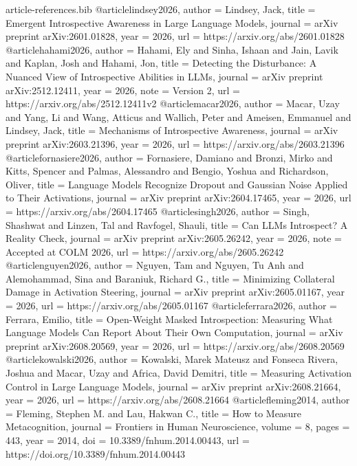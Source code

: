 \begin{filecontents*}{article-references.bib}
@article{lindsey2026,
  author = {Lindsey, Jack},
  title = {Emergent Introspective Awareness in Large Language Models},
  journal = {arXiv preprint arXiv:2601.01828},
  year = {2026}, url = {https://arxiv.org/abs/2601.01828}
}
@article{hahami2026,
  author = {Hahami, Ely and Sinha, Ishaan and Jain, Lavik and Kaplan, Josh and Hahami, Jon},
  title = {Detecting the Disturbance: A Nuanced View of Introspective Abilities in {LLMs}},
  journal = {arXiv preprint arXiv:2512.12411},
  year = {2026}, note = {Version 2},
  url = {https://arxiv.org/abs/2512.12411v2}
}
@article{macar2026,
  author = {Macar, Uzay and Yang, Li and Wang, Atticus and Wallich, Peter and Ameisen, Emmanuel and Lindsey, Jack},
  title = {Mechanisms of Introspective Awareness},
  journal = {arXiv preprint arXiv:2603.21396},
  year = {2026}, url = {https://arxiv.org/abs/2603.21396}
}
@article{fornasiere2026,
  author = {Fornasiere, Damiano and Bronzi, Mirko and Kitts, Spencer and Palmas, Alessandro and Bengio, Yoshua and Richardson, Oliver},
  title = {Language Models Recognize Dropout and {Gaussian} Noise Applied to Their Activations},
  journal = {arXiv preprint arXiv:2604.17465},
  year = {2026}, url = {https://arxiv.org/abs/2604.17465}
}
@article{singh2026,
  author = {Singh, Shashwat and Linzen, Tal and Ravfogel, Shauli},
  title = {Can {LLMs} Introspect? A Reality Check},
  journal = {arXiv preprint arXiv:2605.26242},
  year = {2026}, note = {Accepted at COLM 2026},
  url = {https://arxiv.org/abs/2605.26242}
}
@article{nguyen2026,
  author = {Nguyen, Tam and Nguyen, Tu Anh and Alemohammad, Sina and Baraniuk, Richard G.},
  title = {Minimizing Collateral Damage in Activation Steering},
  journal = {arXiv preprint arXiv:2605.01167},
  year = {2026}, url = {https://arxiv.org/abs/2605.01167}
}
@article{ferrara2026,
  author = {Ferrara, Emilio},
  title = {Open-Weight Masked Introspection: Measuring What Language Models Can Report About Their Own Computation},
  journal = {arXiv preprint arXiv:2608.20569},
  year = {2026}, url = {https://arxiv.org/abs/2608.20569}
}
@article{kowalski2026,
  author = {Kowalski, Marek Mateusz and {Fonseca Rivera}, Joshua and Macar, Uzay and Africa, David Demitri},
  title = {Measuring Activation Control in Large Language Models},
  journal = {arXiv preprint arXiv:2608.21664},
  year = {2026}, url = {https://arxiv.org/abs/2608.21664}
}
@article{fleming2014,
  author = {Fleming, Stephen M. and Lau, Hakwan C.},
  title = {How to Measure Metacognition},
  journal = {Frontiers in Human Neuroscience},
  volume = {8}, pages = {443}, year = {2014},
  doi = {10.3389/fnhum.2014.00443},
  url = {https://doi.org/10.3389/fnhum.2014.00443}
}
\end{filecontents*}

